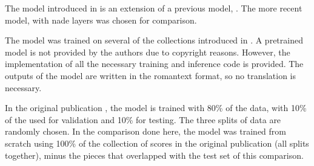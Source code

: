 
The model introduced in \textcite{micchi2021deep} is an
extension of a previous model, \textcite{micchi2020not}. The
more recent model, with \gls{nade} layers was chosen for
comparison.

The model was trained on several of the collections
introduced in . A
pretrained model is not provided by the authors due to
copyright reasons. However, the implementation of all the
necessary training and inference code is provided. The
outputs of the model are written in the \gls{romantext}
format, so no translation is necessary. 

In the original publication \parencite{micchi2021deep}, the
model is trained with 80\% of the data, with 10\% of the
used for validation and 10\% for testing. The three splits
of data are randomly chosen. In the comparison done here,
the model was trained from scratch using 100\% of the
collection of scores in the original publication (all splits
together), minus the pieces that overlapped with the test
set of this comparison.
